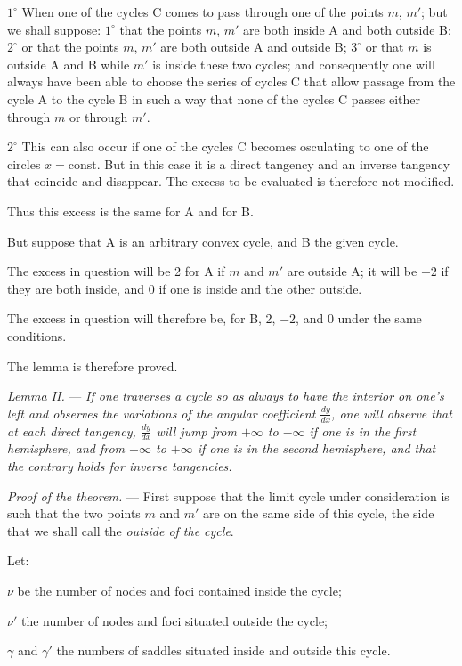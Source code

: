 \documentclass[11pt]{article}
\begin{document}
$1^\circ$ When one of the cycles C comes to pass through one of the points $m$, $m'$; but we shall suppose: $1^\circ$ that the points $m$, $m'$ are both inside A and both outside B; $2^\circ$ or that the points $m$, $m'$ are both outside A and outside B; $3^\circ$ or that $m$ is outside A and B while $m'$ is inside these two cycles; and consequently one will always have been able to choose the series of cycles C that allow passage from the cycle A to the cycle B in such a way that none of the cycles C passes either through $m$ or through $m'$.

$2^\circ$ This can also occur if one of the cycles C becomes osculating to one of the circles $x=\mathrm{const.}$ But in this case it is a direct tangency and an inverse tangency that coincide and disappear. The excess to be evaluated is therefore not modified.

Thus this excess is the same for A and for B.

But suppose that A is an arbitrary convex cycle, and B the given cycle.

The excess in question will be 2 for A if $m$ and $m'$ are outside A; it will be $-2$ if they are both inside, and 0 if one is inside and the other outside.

The excess in question will therefore be, for B, 2, $-2$, and 0 under the same conditions.

The lemma is therefore proved.

\emph{Lemma II.} --- \emph{If one traverses a cycle so as always to have the interior on one's left and observes the variations of the angular coefficient $\frac{dy}{dx}$, one will observe that at each direct tangency, $\frac{dy}{dx}$ will jump from $+\infty$ to $-\infty$ if one is in the first hemisphere, and from $-\infty$ to $+\infty$ if one is in the second hemisphere, and that the contrary holds for inverse tangencies.}

\emph{Proof of the theorem.} --- First suppose that the limit cycle under consideration is such that the two points $m$ and $m'$ are on the same side of this cycle, the side that we shall call the \emph{outside of the cycle}.

Let:

$\nu$ be the number of nodes and foci contained inside the cycle;

$\nu'$ the number of nodes and foci situated outside the cycle;

$\gamma$ and $\gamma'$ the numbers of saddles situated inside and outside this cycle.
\end{document}
